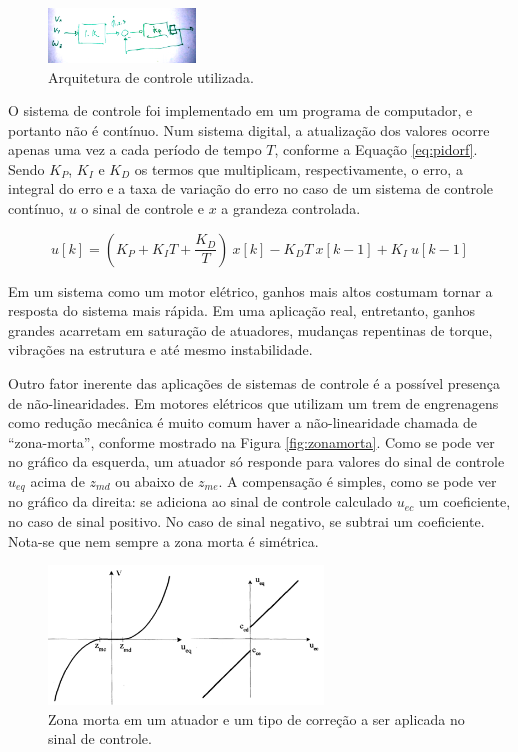 \begin{figure}[h]
  \centering
  \includegraphics[width = 0.35\textwidth]{imagens/controle}
  \caption{Arquitetura de controle utilizada.}
  \label{fig:controle}
\end{figure}

O sistema de controle foi implementado em um programa de computador, e portanto não é contínuo. Num sistema digital, a atualização dos valores ocorre apenas uma vez a cada período de tempo $T$, conforme a Equação \ref{eq:pidorf}. Sendo $K_P$, $K_I$ e $K_D$ os termos que multiplicam, respectivamente, o erro, a integral do erro e a taxa de variação do erro no caso de um sistema de controle contínuo, $u$ o sinal de controle e $x$ a grandeza controlada. \citep{dorf2008modern}

\begin{equation}
  u[k] = (K_P+K_I T+\frac{K_D}{T})\ x[k] - K_D T\ x[k-1] + K_I\ u[k-1]
  \label{eq:pidorf}
\end{equation}

Em um sistema como um motor elétrico, ganhos mais altos costumam tornar a resposta do sistema mais rápida. Em uma aplicação real, entretanto, ganhos grandes acarretam em saturação de atuadores, mudanças repentinas de torque, vibrações na estrutura e até mesmo instabilidade. \citep{lynch2017modern}

Outro fator inerente das aplicações de sistemas de controle é a possível presença de não-linearidades. Em motores elétricos que utilizam um trem de engrenagens como redução mecânica é muito comum haver a não-linearidade chamada de ``zona-morta'', conforme mostrado na Figura \ref{fig:zonamorta}. Como se pode ver no gráfico da esquerda, um atuador só responde para valores do sinal de controle $u_{eq}$ acima de $z_{md}$ ou abaixo de $z_{me}$. A compensação é simples, como se pode ver no gráfico da direita: se adiciona ao sinal de controle calculado $u_{ec}$ um coeficiente, no caso de sinal positivo. No caso de sinal negativo, se subtrai um coeficiente. Nota-se que nem sempre a zona morta é simétrica.

\begin{figure}[h]
  \centering
  \includegraphics[width = 0.65\textwidth]{imagens/zonamorta0}
  \caption{Zona morta em um atuador e um tipo de correção a ser aplicada no sinal de controle.}
  \label{fig:cont_zm}
\end{figure}

